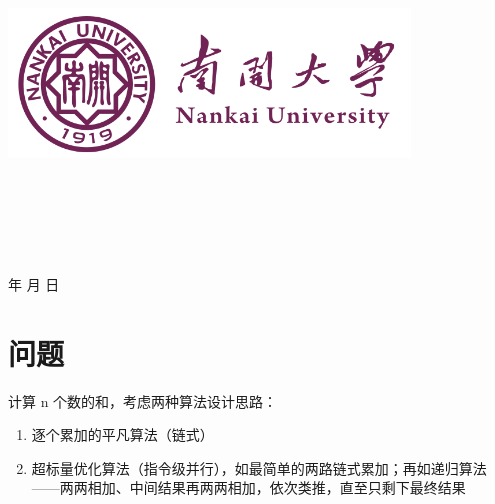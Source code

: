 \documentclass[a4paper]{article}
\newcommand{\HRule}{\rule{\linewidth}{0.5mm}}%
\begin{document}
\renewcommand{\contentsname}{目\ 录}
\renewcommand{\appendixname}{附录}
\renewcommand{\appendixpagename}{附录}
\renewcommand{\refname}{参考文献}
\renewcommand{\figurename}{图}
\renewcommand{\tablename}{表}
\renewcommand{\today}{\number\year 年 \number\month 月 \number\day 日}

\begin{titlepage}
  \begin{center}
    \includegraphics[width=0.8\textwidth]{NKU.png}\\[1cm]
    \vspace{20mm}
    \textbf{\huge\textbf{}}\\[0.5cm]
    \textbf{\huge{}}\\[2.3cm]
    \textbf{\Huge\textbf{}}

    \vspace{\fill}

    \centering
    \textsc{\LARGE {}}\\[0.5cm]
    \textsc{\LARGE {}}\\[0.5cm]
    \textsc{\LARGE {}}\\[0.5cm]

    \vfill
    {\Large \today}
  \end{center}
\end{titlepage}

\renewcommand {\thefigure}{\thesection{}.\arabic{figure}}%
\renewcommand{\figurename}{图}
\renewcommand{\contentsname}{目录}

\clearpage
\tableofcontents
\newpage

\section{问题}
计算 n 个数的和，考虑两种算法设计思路：
\begin{enumerate}
  \item 逐个累加的平凡算法（链式）
  \item 超标量优化算法（指令级并行），如最简单的两路链式累加；再如递归算法——两两相加、中间结果再两两相加，依次类推，直至只剩下最终结果
\end{enumerate}
\end{document}
